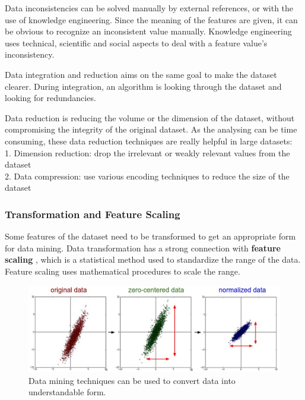 Data inconsistencies can be solved manually by external references, or with the use of knowledge engineering. Since the meaning of the features are given, it can be obvious to recognize an inconsistent value manually. Knowledge engineering uses technical, scientific and social aspects to deal with a feature value's inconsistency.\medskip

Data integration and reduction aims on the same goal to make the dataset clearer. During integration, an algorithm is looking through the dataset and looking for redundancies. \medskip

Data reduction is reducing the volume or the dimension of the dataset, without compromising the integrity of the original dataset. As the analysing can be time consuming, these data reduction techniques are really helpful in large datasets:\\
1. Dimension reduction: drop the irrelevant or weakly relevant values from the dataset\\
2. Data compression: use various encoding techniques to reduce the size of the dataset


\subsubsection{Transformation and Feature Scaling}

Some features of the dataset need to be transformed to get an appropriate form for data mining. Data transformation has a strong connection with \textbf{feature scaling} \cite{zheng2018feature, dong2018feature}, which is a statistical method used to standardize the range of the data. Feature scaling uses mathematical procedures to scale the range. 

\begin{figure}[h]
	\centering
	\includegraphics[height=0.35\linewidth]{./figures/data_mining}
	\caption{Data mining techniques can be used to convert data into understandable form.}
	\label{fig:data_mining}
\end{figure}


